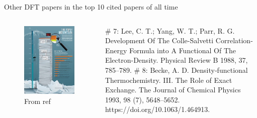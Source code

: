 \documentclass[aspectratio=169]{beamer}
\begin{document}
\begin{frame}{Other DFT papers in the top 10 cited papers of all time}
\begin{columns}
    \begin{figure}
        \centering
        \includegraphics[width=\linewidth]{lectures/figures/5_paper_mountain.jpg}
    \caption{From ref \cite{vannoordenTop100Papers2014}}
    \end{figure}
    \# 7: Lee, C. T.; Yang, W. T.; Parr, R. G. Development Of The Colle-Salvetti Correlation-Energy Formula into A Functional Of The Electron-Density. Physical Review B 1988, 37, 785–789.\cite{leeDevelopmentColleSalvettiCorrelationEnergy1988}\newline
    \newline
    \# 8: Becke, A. D. Density‐functional Thermochemistry. III. The Role of Exact Exchange. The Journal of Chemical Physics 1993, 98 (7), 5648–5652. https://doi.org/10.1063/1.464913.\cite{beckeDensityFunctionalThermochemistry1993}

\end{columns}    
\end{frame}
\end{document}
